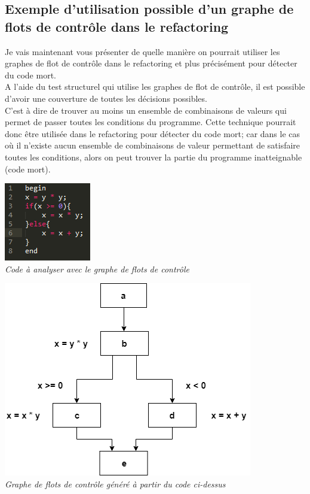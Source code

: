 \documentclass[a4paper,twoside,12pt,openright]{report}
\begin{document}
\subsection{Exemple d'utilisation possible d'un graphe de flots de contrôle dans le refactoring}

Je vais maintenant vous présenter de quelle manière on pourrait utiliser les graphes de flot de contrôle dans le refactoring et plus précisément pour détecter du code mort.\\
A l'aide du test structurel qui utilise les graphes de flot de contrôle, il est possible d'avoir une couverture de toutes les décisions possibles\cite{ref13}.\\
C'est à dire de trouver au moins un ensemble de combinaisons de valeurs qui permet de passer toutes les conditions du programme. Cette technique pourrait donc être utilisée dans le refactoring pour détecter du code mort; car dans le cas où il n'existe aucun ensemble de combinaisons de valeur permettant de satisfaire toutes les conditions, alors on peut trouver la partie du programme inatteignable (code mort).\\

\begin{center}
\includegraphics[scale=1.5]{Image/ExempleCodeGraphe.png}\\
\itshape{Code à analyser avec le graphe de flots de contrôle}
\end{center}

\begin{center}
\includegraphics[scale=0.8]{Image/ExempleGraphe.png}\\
\itshape{Graphe de flots de contrôle généré à partir du code ci-dessus}
\end{center}
\end{document}
